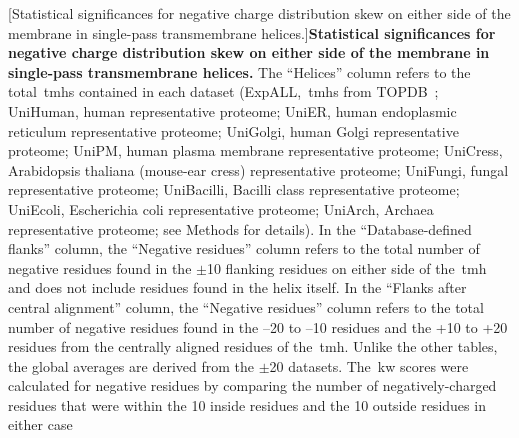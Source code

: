 \begin{table}[htbp!]

    \centering
    [Statistical significances for negative charge distribution skew on either side of the membrane in single\--pass transmembrane helices.]{\textbf{Statistical significances for negative charge distribution skew on either side of the membrane in single\--pass transmembrane helices.} The “Helices” column refers to the total~\gls{tmh}s contained in each dataset (ExpALL,~\gls{tmh}s from TOPDB~\cite{Dobson2015}; UniHuman, human representative proteome; UniER, human endoplasmic reticulum representative proteome; UniGolgi, human Golgi representative proteome; UniPM, human plasma membrane representative proteome; UniCress, Arabidopsis thaliana (mouse-ear cress) representative proteome; UniFungi, fungal representative proteome; UniBacilli, Bacilli class representative proteome; UniEcoli, Escherichia coli representative proteome; UniArch, Archaea representative proteome; see Methods for details).
In the ``Database-defined flanks'' column, the ``Negative residues'' column refers to the total number of negative residues found in the $\pm$10 flanking residues on either side of the~\gls{tmh} and does not include residues found in the helix itself.
In the ``Flanks after central alignment'' column, the ``Negative residues'' column refers to the total number of negative residues found in the –20 to –10 residues and the +10 to +20 residues from the centrally aligned residues of the~\gls{tmh}.
Unlike the other tables, the global averages are derived from the $\pm$20 datasets.
The~\gls{kw} scores were calculated for negative residues by comparing the number of negatively\--charged residues that were within the 10 inside residues and the 10 outside residues in either case}
\end{table}
